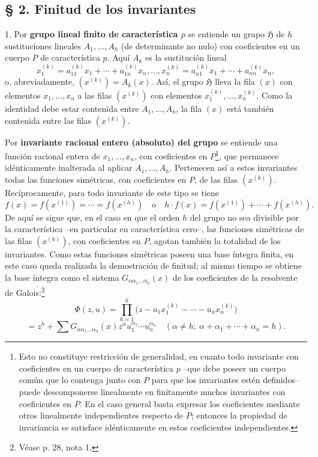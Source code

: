 \documentclass[11pt]{article}
\begin{document}
\subsection*{§ 2. Finitud de los invariantes}

1. Por \textbf{grupo lineal finito de característica $p$} se entiende un grupo $\mathfrak H$ de $h$ sustituciones lineales $A_1,\ldots,A_h$ (de determinante no nulo) con coeficientes en un cuerpo $P$ de característica $p$. Aquí $A_k$ es la sustitución lineal
\[
 x_1^{(k)}=a_{11}^{(k)}x_1+\cdots+a_{1n}^{(k)}x_n,
 \ldots,
 x_n^{(k)}=a_{n1}^{(k)}x_1+\cdots+a_{nn}^{(k)}x_n,
\]
o, abreviadamente, $(x^{(k)})=A_k(x)$. Así, el grupo $\mathfrak H$ lleva la fila $(x)$ con elementos $x_1,\ldots,x_n$ a las filas $(x^{(k)})$ con elementos $x_1^{(k)},\ldots,x_n^{(k)}$. Como la identidad debe estar contenida entre $A_1,\ldots,A_h$, la fila $(x)$ está también contenida entre las filas $(x^{(k)})$.

Por \textbf{invariante racional entero (absoluto) del grupo} se entiende una función racional entera de $x_1,\ldots,x_n$, con coeficientes en $P$\footnote{Esto no constituye restricción de generalidad, en cuanto todo invariante con coeficientes en un cuerpo de característica $p$ --que debe poseer un cuerpo común que lo contenga junto con $P$ para que los invariantes estén definidos-- puede descomponerse linealmente en finitamente muchos invariantes con coeficientes en $P$. En el caso general basta expresar los coeficientes mediante otros linealmente independientes respecto de $P$; entonces la propiedad de invariancia se satisface idénticamente en estos coeficientes independientes.}, que permanece idénticamente inalterada al aplicar $A_1,\ldots,A_h$. Pertenecen así a estos invariantes todas las funciones simétricas, con coeficientes en $P$, de las filas $(x^{(k)})$. Recíprocamente, para todo invariante de este tipo se tiene
\[
 f(x)=f(x^{(1)})=\cdots=f(x^{(h)})
 \quad\text{o}\quad
 h\cdot f(x)=f(x^{(1)})+\cdots+f(x^{(h)}).
\]
De aquí se sigue que, en el caso en que el orden $h$ del grupo no sea divisible por la característica --en particular en característica cero--, las funciones simétricas de las filas $(x^{(k)})$, con coeficientes en $P$, agotan también la totalidad de los invariantes. Como estas funciones simétricas poseen una base íntegra finita, en este caso queda realizada la demostración de finitud; al mismo tiempo se obtiene la base íntegra como el sistema $G_{\alpha\alpha_1\ldots\alpha_n}(x)$ de los coeficientes de la resolvente de Galois:\footnote{Véase p. 28, nota 1.}
\[
 \Phi(z,u)=\prod_{k=1}^{h}\bigl(z-u_1x_1^{(k)}-\cdots-u_nx_n^{(k)}\bigr)
\]
\[
 =z^h+\sum G_{\alpha\alpha_1\ldots\alpha_n}(x)
 z^{\alpha}u_1^{\alpha_1}\cdots u_n^{\alpha_n}
 \quad(\alpha\ne h;\ \alpha+\alpha_1+\cdots+\alpha_n=h).
\]
\end{document}
